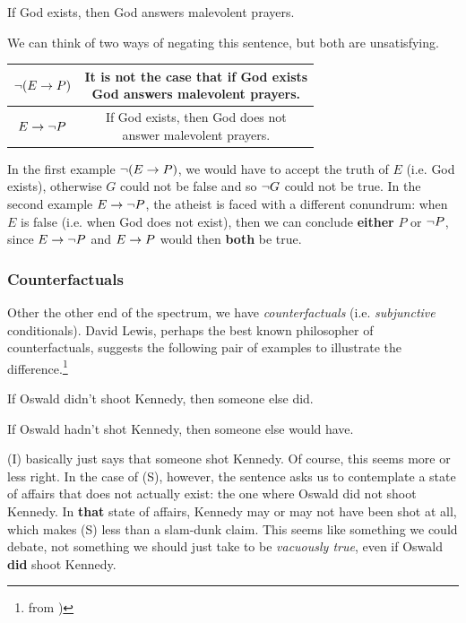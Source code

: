 \begin{argument}
\item[G:] If God exists, then God answers malevolent prayers.
\end{argument}

We can think of two ways of negating this sentence, but both are unsatisfying.

\begin{center}
  \begin{tabular}{|c|c|}
    \hline
    $\neg(E\rightarrow P)$ & \makecell{It is not the case that if God exists\\God answers malevolent prayers.} \\
    \hline
    $E\rightarrow\neg P$ & \makecell{If God exists, then God does not\\answer malevolent prayers.} \\
    \hline
  \end{tabular}
\end{center}

In the first example $\neg(E\rightarrow P)$, we would have to accept the truth of
$E$ (i.e. God exists), otherwise $G$ could not be false and so $\neg G$ could
not be true. In the second example $E\rightarrow\neg P$, the atheist is faced with
a different conundrum: when $E$ is false (i.e. when God does not exist), then
we can conclude \textbf{either} $P$ or $\neg P$, since $E\rightarrow\neg P$ and
$E\rightarrow P$ would then \textbf{both} be true.

\subsubsection{Counterfactuals}

Other the other end of the spectrum, we have \emph{counterfactuals} (i.e.
\emph{subjunctive} conditionals). David Lewis, perhaps the best known
philosopher of counterfactuals, suggests the following pair of examples
to illustrate the difference.\footnote{from \cite[][p 162]{Smi20})}

\begin{argument}
\item[I:] If Oswald didn't shoot Kennedy, then someone else did.
\item[S:] If Oswald hadn't shot Kennedy, then someone else would have.
\end{argument}

(I) basically just says that someone shot Kennedy. Of course, this seems more
or less right. In the case of (S), however, the sentence asks us to contemplate
a state of affairs that does not actually exist: the one where Oswald did not
shoot Kennedy. In \textbf{that} state of affairs, Kennedy may or may not have
been shot at all, which makes (S) less than a slam-dunk claim. This seems like
something we could debate, not something we should just take to be
\emph{vacuously true}, even if Oswald \textbf{did} shoot Kennedy.

